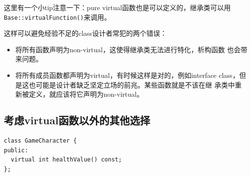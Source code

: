 这里有一个小tip注意一下：pure virtual函数也是可以定义的，继承类可以用
\texttt{Base::virtualFunction()}来调用。

这样可以避免经验不足的class设计者常犯的两个错误：
\begin{itemize}
\item 将所有函数声明为non-virtual，这使得继承类无法进行特化，析构函数
  也会带来问题。
\item 将所有成员函数都声明为virtual，有时候这样是对的，例如interface
  class，但是这也可能是设计者缺乏坚定立场的前兆。某些函数就是不该在继
  承类中重新被定义，就应该将它声明为non-virtual。
\end{itemize}


\subsection{考虑virtual函数以外的其他选择}
\label{sec:Item-35}

\begin{verbatim}
class GameCharacter {
public:
  virtual int healthValue() const;
};
\end{verbatim}


